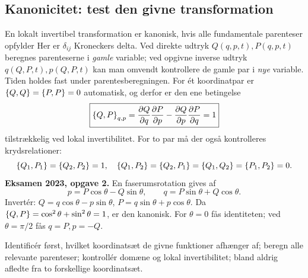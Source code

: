 \subsection{Kanonicitet: test den givne transformation}
En lokalt invertibel transformation er kanonisk, hvis alle fundamentale parenteser opfylder
Her er $\delta_{ij}$ Kroneckers delta. Ved direkte udtryk $Q(q,p,t),P(q,p,t)$ beregnes parenteserne i \emph{gamle} variable; ved opgivne inverse udtryk $q(Q,P,t),p(Q,P,t)$ kan man omvendt kontrollere de gamle par i \emph{nye} variable. Tiden holdes fast under parentesberegningen.
For ét koordinatpar er $\left\{Q,Q\right\}=\left\{P,P\right\}=0$ automatisk, og derfor er den ene betingelse
\[
\boxed{\left\{Q,P\right\}_{q,p}=
\frac{\partial Q}{\partial q}\frac{\partial P}{\partial p}
-\frac{\partial Q}{\partial p}\frac{\partial P}{\partial q}=1}
\]
tilstrækkelig ved lokal invertibilitet. For to par må der også kontrolleres krydsrelationer:
\[
\left\{Q_1,P_1\right\}=\left\{Q_2,P_2\right\}=1,\quad
\left\{Q_1,P_2\right\}=\left\{Q_2,P_1\right\}
=\left\{Q_1,Q_2\right\}=\left\{P_1,P_2\right\}=0.
\]
\textbf{Eksamen 2023, opgave 2.} En faserumsrotation gives af
\[
p=P\cos\theta-Q\sin\theta,\qquad
q=P\sin\theta+Q\cos\theta.
\]
Invertér: $Q=q\cos\theta-p\sin\theta$, $P=q\sin\theta+p\cos\theta$. Da
$\left\{Q,P\right\}=\cos^2\theta+\sin^2\theta=1$, er den kanonisk. For $\theta=0$ fås identiteten; ved $\theta=\pi/2$ fås $q=P,p=-Q$.
\begin{method}Identificér først, hvilket koordinatsæt de givne funktioner afhænger af; beregn alle relevante parenteser; kontrollér domæne og lokal invertibilitet; bland aldrig afledte fra to forskellige koordinatsæt.\end{method}

